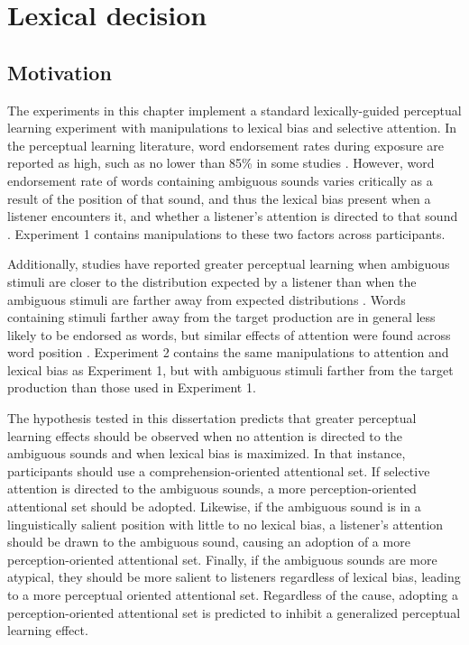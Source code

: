 
\chapter{Lexical decision}
\label{chap:lexdec}


\section{Motivation}

The experiments in this chapter implement a standard lexically-guided perceptual learning experiment with manipulations to lexical bias and selective attention.  
In the perceptual learning literature, word endorsement rates during exposure are reported as high, such as no lower than 85\% in some studies \citep{Reinisch2013}. 
However, word endorsement rate of words containing ambiguous sounds varies critically as a result of the position of that sound, and thus the lexical bias present when a listener encounters it, and whether a listener's attention is directed to that sound \citep{Pitt2012}.  
Experiment 1 contains manipulations to these two factors across participants.

Additionally, studies have reported greater perceptual learning when ambiguous stimuli are closer to the distribution expected by a listener than when the ambiguous stimuli are farther away from expected distributions \citep{Sumner2011}.  
Words containing stimuli farther away from the target production are in general less likely to be endorsed as words, but similar effects of attention were found across word position \citep{Pitt2012}.  
Experiment 2 contains the same manipulations to attention and lexical bias as Experiment 1, but with ambiguous stimuli farther from the target production than those used in Experiment 1.

The hypothesis tested in this dissertation predicts that greater perceptual learning effects should be observed when no attention is directed to the ambiguous sounds and when lexical bias is maximized.  
In that instance, participants should use a comprehension-oriented attentional set.  
If selective attention is directed to the ambiguous sounds, a more perception-oriented attentional set should be adopted.  
Likewise, if the ambiguous sound is in a linguistically salient position with little to no lexical bias, a listener's attention should be drawn to the ambiguous sound, causing an adoption of a more perception-oriented attentional set.  
Finally, if the ambiguous sounds are more atypical, they should be more salient to listeners regardless of lexical bias, leading to a more perceptual oriented attentional set.  
Regardless of the cause, adopting a perception-oriented attentional set is predicted to inhibit a generalized perceptual learning effect.

